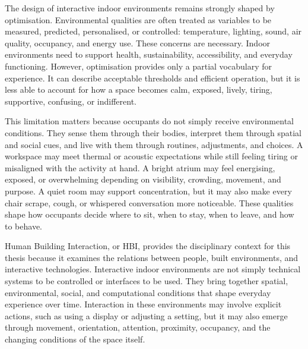 The design of interactive indoor environments remains strongly shaped by optimisation. Environmental qualities are often treated as variables to be measured, predicted, personalised, or controlled: temperature, lighting, sound, air quality, occupancy, and energy use. These concerns are necessary. Indoor environments need to support health, sustainability, accessibility, and everyday functioning. However, optimisation provides only a partial vocabulary for experience. It can describe acceptable thresholds and efficient operation, but it is less able to account for how a space becomes calm, exposed, lively, tiring, supportive, confusing, or indifferent.

This limitation matters because occupants do not simply receive environmental conditions. They sense them through their bodies, interpret them through spatial and social cues, and live with them through routines, adjustments, and choices. A workspace may meet thermal or acoustic expectations while still feeling tiring or misaligned with the activity at hand. A bright atrium may feel energising, exposed, or overwhelming depending on visibility, crowding, movement, and purpose. A quiet room may support concentration, but it may also make every chair scrape, cough, or whispered conversation more noticeable. These qualities shape how occupants decide where to sit, when to stay, when to leave, and how to behave.

Human Building Interaction, or HBI, provides the disciplinary context for this thesis because it examines the relations between people, built environments, and interactive technologies. Interactive indoor environments are not simply technical systems to be controlled or interfaces to be used. They bring together spatial, environmental, social, and computational conditions that shape everyday experience over time. Interaction in these environments may involve explicit actions, such as using a display or adjusting a setting, but it may also emerge through movement, orientation, attention, proximity, occupancy, and the changing conditions of the space itself.


